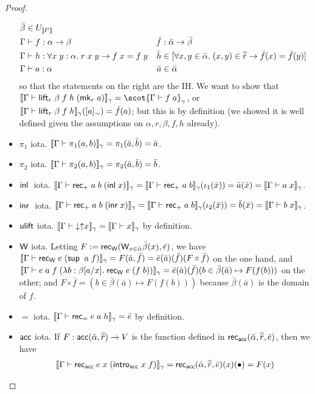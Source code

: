 \begin{proof}
\begin{itemize}
\begin{align*}
\bar\beta&\in U_{\scott{\ell'}}\\
\Gamma&\vdash f:\alpha\to\beta&
\bar f&:\bar\alpha\to\bar\beta\\
\Gamma&\vdash h:\forall x\;y:\alpha.\;r\;x\;y\to f\;x=f\;y&
\bar h&\in [\forall x,y\in\bar\alpha.\;(x,y)\in\overline{\bar r}\to \bar f(x)=\bar f(y)]\\
\Gamma&\vdash a:\alpha&
\bar a&\in \bar\alpha
\end{align*}
so that the statements on the right are the IH. We want to show that $\scott{\Gamma\vdash \lift_r\;\beta\;f\;h\;(\mk_r\;a)}_\gamma=\scot{\Gamma\vdash f\;a}_\gamma$, or $\scott{\Gamma\vdash \lift_r\;\beta\;f\;h}_\gamma([a]_{\sim})=\bar f(a)$; but this is by definition (we showed it is well defined given the assumptions on $\alpha,r,\beta,f,h$ already).
\item $\pi_1$ iota. $\scott{\Gamma\vdash\pi_1(a,b)}_\gamma=\pi_1(\bar a,\bar b)=\bar a$.
\item $\pi_2$ iota. $\scott{\Gamma\vdash\pi_2(a,b)}_\gamma=\pi_2(\bar a,\bar b)=\bar b$.
\item $\mathsf{inl}\;$ iota. $\scott{\Gamma\vdash\rec_+\;a\;b\;(\inl x)}_\gamma=\scott{\Gamma\vdash\rec_+\;a\;b}_\gamma(\iota_1(\bar x))=\bar a(\bar x)=\scott{\Gamma\vdash a\;x}_\gamma$.
\item $\mathsf{inr}\;$ iota. $\scott{\Gamma\vdash\rec_+\;a\;b\;(\inr x)}_\gamma=\scott{\Gamma\vdash\rec_+\;a\;b}_\gamma(\iota_2(\bar x))=\bar b(\bar x)=\scott{\Gamma\vdash b\;x}_\gamma$.
\item $\mathsf{ulift}$ iota. $\scott{\Gamma\vdash{\downarrow\uparrow}x}_\gamma=\scott{\Gamma\vdash x}_\gamma$ by definition.
\item $\mathsf{W}$ iota. Letting $F:=\mathsf{rec}_{\mathsf{W}}(\mathsf{W}_{x\in\bar\alpha}\bar\beta(x),\bar e)$, we have $\scott{\Gamma\vdash\rec_\W\;e\;(\sup\;a\;f)}_\gamma=F(\bar a,\bar f)=\bar e(\bar a)(\bar f)(F\circ \bar f)$ on the one hand, and $\scott{\Gamma\vdash e\;a\;f\;(\lambda b:\beta[a/x].\;\rec_\W\;e\;(f\;b))}_\gamma=\bar e(\bar a)(\bar f)(b\in\bar\beta(\bar a)\mapsto F(f(b)))$ on the other; and $F\circ \bar f=(b\in\bar\beta(\bar a)\mapsto F(f(b)))$ because $\bar\beta(\bar a)$ is the domain of $f$.
\item $=$ iota. $\scott{\Gamma\vdash\rec_=\;e\;a\;h}_\gamma=\bar e$ by definition.
\item $\mathsf{acc}$ iota. If $F:\mathsf{acc}(\bar\alpha,\overline{\bar r})\to V$ is the function defined in $\mathsf{rec}_{\mathsf{acc}}(\bar\alpha,\overline{\bar r},\bar e)$, then we have
\begin{align*}
\scott{\Gamma\vdash\rec_\acc\;e\;x\;(\intro_\acc\;x\;f)}_\gamma&=\rec_\acc(\bar\alpha,\overline{\bar r},\bar e)(x)(\bullet)=F(x)\\

\end{align*}
\end{itemize}
\end{proof}
